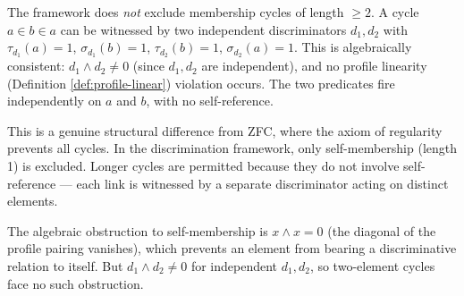 \begin{remark}
\label{rem:cycles}
The framework does \emph{not} exclude membership cycles
of length $\geq 2$. A cycle $a \in b \in a$ can be
witnessed by two independent discriminators $d_1, d_2$
with $\tau_{d_1}(a) = 1$, $\sigma_{d_1}(b) = 1$,
$\tau_{d_2}(b) = 1$, $\sigma_{d_2}(a) = 1$. This is
algebraically consistent: $d_1 \wedge d_2 \neq 0$ (since
$d_1, d_2$ are independent), and no profile linearity (Definition \ref{def:profile-linear})
violation occurs. The two predicates fire independently
on $a$ and $b$, with no self-reference.

This is a genuine structural difference from ZFC, where
the axiom of regularity prevents all cycles. In the
discrimination framework, only self-membership (length 1)
is excluded. Longer cycles are permitted because they
do not involve self-reference --- each link is witnessed
by a separate discriminator acting on distinct elements.

The algebraic obstruction to self-membership is
$x \wedge x = 0$ (the diagonal of the profile pairing
vanishes), which prevents an element from bearing a
discriminative relation to itself. But
$d_1 \wedge d_2 \neq 0$ for independent $d_1, d_2$, so
two-element cycles face no such obstruction.
\end{remark}


